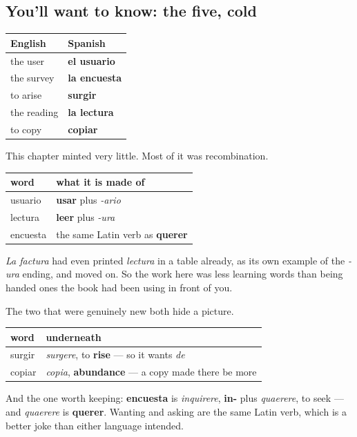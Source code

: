 \subsection*{You'll want to know: the five, cold}
\noindent
\begin{tabularx}{\linewidth}{@{}>{\raggedright\arraybackslash}X>{\raggedright\arraybackslash}X@{}}
\toprule
\textbf{English} & \textbf{Spanish} \\
\midrule
the user & \textbf{el usuario} \\
the survey & \textbf{la encuesta} \\
to arise & \textbf{surgir} \\
the reading & \textbf{la lectura} \\
to copy & \textbf{copiar} \\
\bottomrule
\end{tabularx}

\begin{grammarlens}[title={Grammar Lens: three of the five were already inside words you hold}]
This chapter minted very little. Most of it was recombination.

\noindent
\begin{tabularx}{\linewidth}{@{}>{\raggedright\arraybackslash}X>{\raggedright\arraybackslash}X@{}}
\toprule
\textbf{word} & \textbf{what it is made of} \\
\midrule
usuario & \textbf{usar} plus \emph{-ario} \\
lectura & \textbf{leer} plus \emph{-ura} \\
encuesta & the same Latin verb as \textbf{querer} \\
\bottomrule
\end{tabularx}

\emph{La factura} had even printed \emph{lectura} in a table already, as its own example of the \emph{-ura} ending, and moved on. So the work here was less learning words than being handed ones the book had been using in front of you.
\end{grammarlens}

\begin{cousinweb}
The two that were genuinely new both hide a picture.

\noindent
\begin{tabularx}{\linewidth}{@{}>{\raggedright\arraybackslash}X>{\raggedright\arraybackslash}X@{}}
\toprule
\textbf{word} & \textbf{underneath} \\
\midrule
surgir & \emph{surgere}, to \textbf{rise} — so it wants \emph{de} \\
copiar & \emph{copia}, \textbf{abundance} — a copy made there be more \\
\bottomrule
\end{tabularx}

And the one worth keeping: \textbf{encuesta} is \emph{inquirere}, \textbf{in-} plus \emph{quaerere}, to seek — and \emph{quaerere} is \textbf{querer}. Wanting and asking are the same Latin verb, which is a better joke than either language intended.
\end{cousinweb}

